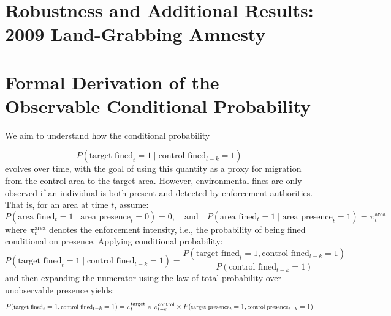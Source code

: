 \documentclass[12pt]{article}
\begin{document}
\begin{appendices}



\clearpage

\section{Robustness and Additional Results: 2009 Land-Grabbing Amnesty} \label{appendix:3}


\clearpage
 


\iffalse
\section*{Formal Derivation of the Observable Conditional Probability}

We aim to understand how the conditional probability

\begin{equation*}
P(\text{target fined}_t = 1 \mid \text{control fined}_{t-k} = 1)
\end{equation*}
evolves over time, with the goal of using this quantity as a proxy for migration from the control area to the target area. However, environmental fines are only observed if an individual is both present and detected by enforcement authorities. That is, for an area at time $t$, assume:
\begin{equation*}
P(\text{area fined}_t = 1 \mid \text{area presence}_t = 0) = 0, \quad \text{and} \quad P(\text{area fined}_t = 1 \mid \text{area presence}_t = 1) = \pi^{\text{area}}_t  
\end{equation*}
where $\pi^{\text{area}}_t$ denotes the enforcement intensity, i.e., the probability of being fined conditional on presence. Applying conditional probability:
\begin{equation*}
P(\text{target fined}_t = 1 \mid \text{control fined}_{t-k} = 1)
=
\frac{
P(\text{target fined}_t = 1, \text{control fined}_{t-k} = 1)
}{
P(\text{control fined}_{t-k} = 1)
}
\end{equation*}
and then expanding the numerator using the law of total probability over unobservable presence yields:
\begin{equation*}
\footnotesize
P(\text{target fined}_t = 1, \text{control fined}_{t-k} = 1)=\pi^{\text{target}}_t \times \pi^{\text{control}}_{t-k} \times P(\text{target presence}_t = 1, \text{control presence}_{t-k} = 1)
\end{equation*}
\ 


\end{appendices}
\end{document}
